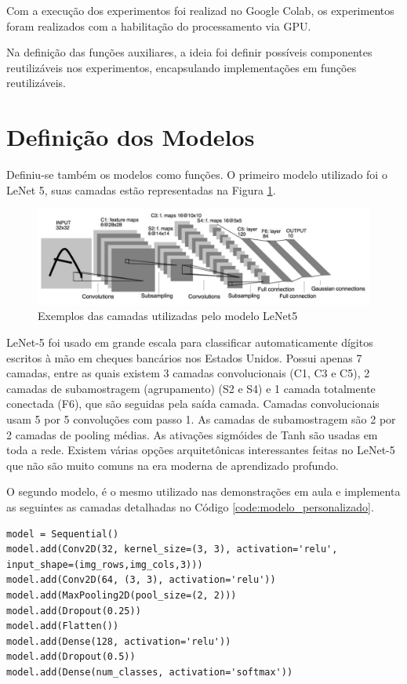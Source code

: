\documentclass[12pt]{article}
\begin{document}
Com a execução dos experimentos foi realizad no Google Colab, os experimentos foram realizados com a habilitação do processamento via GPU.

Na definição das funções auxiliares, a ideia foi definir possíveis componentes reutilizáveis nos experimentos, encapsulando implementações em funções reutilizáveis.

\section{Definição dos Modelos}

Definiu-se também os modelos como funções. O primeiro modelo utilizado foi o LeNet 5, suas camadas estão representadas na Figura \ref{fig:image_lenet}.

\begin{figure}[!htb]
  \centering
  \includegraphics[width=35em]{images/image_lenet.jpeg}
  \caption{Exemplos das camadas utilizadas pelo modelo LeNet5}
  \label{fig:image_lenet}
\end{figure}

LeNet-5 foi usado em grande escala para classificar automaticamente dígitos escritos à mão em cheques bancários nos Estados Unidos. Possui apenas 7 camadas, entre as quais existem 3 camadas convolucionais (C1, C3 e C5), 2 camadas de subamostragem (agrupamento) (S2 e S4) e 1 camada totalmente conectada (F6), que são seguidas pela saída camada. Camadas convolucionais usam 5 por 5 convoluções com passo 1. As camadas de subamostragem são 2 por 2 camadas de pooling médias. As ativações sigmóides de Tanh são usadas em toda a rede. Existem várias opções arquitetônicas interessantes feitas no LeNet-5 que não são muito comuns na era moderna de aprendizado profundo.

O segundo modelo, é o mesmo utilizado nas demonstrações em aula e implementa as seguintes as camadas detalhadas no Código \ref{code:modelo_personalizado}.

\begin{lstlisting}[caption={Modelo Personalizado},captionpos=b,frame=single,label={code:modelo_personalizado}]
model = Sequential()
model.add(Conv2D(32, kernel_size=(3, 3), activation='relu', input_shape=(img_rows,img_cols,3)))
model.add(Conv2D(64, (3, 3), activation='relu'))
model.add(MaxPooling2D(pool_size=(2, 2)))
model.add(Dropout(0.25))
model.add(Flatten())
model.add(Dense(128, activation='relu'))
model.add(Dropout(0.5))
model.add(Dense(num_classes, activation='softmax'))
\end{lstlisting}
\end{document}
